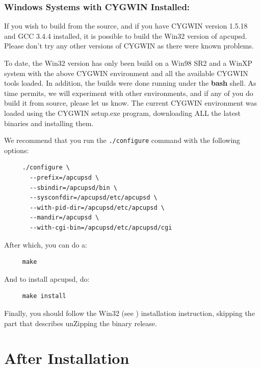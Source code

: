 \subsubsection*{Windows Systems with CYGWIN Installed:}

\label{index-Windows-55}
\label{index-OS_002c-Windows-56}
If you wish to build from the source, and if you have CYGWIN version 1.5.18 and
GCC 3.4.4 installed, it is possible to build the Win32 version of apcupsd.
Please don't try any other versions of CYGWIN as there were known problems.  

To date, the Win32 version has only been build on a Win98 SR2 and a WinXP
system with the above CYGWIN environment and all the available CYGWIN tools
loaded. In addition, the builds were done running under the {\bf bash} shell.
As time permits, we will experiment with other environments, and if any of you
do build it from source, please let us know. The current CYGWIN environment
was loaded using the CYGWIN setup.exe program, downloading ALL the latest
binaries and installing them.  

We recommend that you run the {\tt ./configure} command with the following
options: 

\footnotesize
\begin{verbatim}
     ./configure \
       --prefix=/apcupsd \
       --sbindir=/apcupsd/bin \
       --sysconfdir=/apcupsd/etc/apcupsd \
       --with-pid-dir=/apcupsd/etc/apcupsd \
       --mandir=/apcupsd \
       --with-cgi-bin=/apcupsd/etc/apcupsd/cgi
\end{verbatim}
\normalsize

After which, you can do a: 

\footnotesize
\begin{verbatim}
     make
\end{verbatim}
\normalsize

And to install apcupsd, do: 

\footnotesize
\begin{verbatim}
     make install
\end{verbatim}
\normalsize

Finally, you should follow the Win32 (see 
)
installation instruction, skipping the part that describes unZipping the
binary release. 

\label{After-Installation}

\section*{After Installation}
\index{Installation!After }

